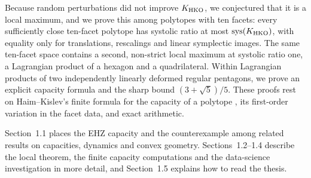 Because random perturbations did not improve $K_{\rm HKO}$, we conjectured
that it is a local maximum, and we prove this among polytopes with ten
facets: every sufficiently close ten-facet polytope has systolic ratio at
most $\operatorname{sys}(K_{\rm HKO})$, with equality only for translations,
rescalings and linear symplectic images. The same ten-facet space contains a
second, non-strict local maximum at systolic ratio one, a Lagrangian product
of a hexagon and a quadrilateral. Within Lagrangian products of two
independently linearly deformed regular pentagons, we prove an explicit
capacity formula and the sharp bound $(3+\sqrt5)/5$.
These proofs rest on Haim--Kislev's finite formula for the capacity of a
polytope \cite{HK2017}, its first-order variation in the facet data, and
exact arithmetic.

Section~1.1 places the EHZ capacity and the counterexample among related
results on capacities, dynamics and convex geometry. Sections~1.2--1.4
describe the local theorem, the finite capacity computations and the
data-science investigation in more detail, and Section~1.5 explains how to
read the thesis.
